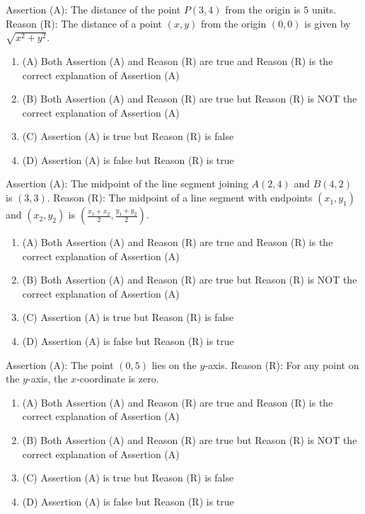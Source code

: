 \documentclass[12pt,a4paper]{exam}
\begin{document}
\begin{questions}
\question[1] Assertion (A): The distance of the point $P(3, 4)$ from the origin is $5$ units. Reason (R): The distance of a point $(x, y)$ from the origin $(0, 0)$ is given by $\sqrt{x^2 + y^2}$.
\begin{enumerate}[label=(\Alph*)]
  \item (A) Both Assertion (A) and Reason (R) are true and Reason (R) is the correct explanation of Assertion (A)
  \item (B) Both Assertion (A) and Reason (R) are true but Reason (R) is NOT the correct explanation of Assertion (A)
  \item (C) Assertion (A) is true but Reason (R) is false
  \item (D) Assertion (A) is false but Reason (R) is true
\end{enumerate}
\vspace{0.15cm}

\question[1] Assertion (A): The midpoint of the line segment joining $A(2, 4)$ and $B(4, 2)$ is $(3, 3)$. Reason (R): The midpoint of a line segment with endpoints $(x_1, y_1)$ and $(x_2, y_2)$ is $(\frac{x_1 + x_2}{2}, \frac{y_1 + y_2}{2})$.
\begin{enumerate}[label=(\Alph*)]
  \item (A) Both Assertion (A) and Reason (R) are true and Reason (R) is the correct explanation of Assertion (A)
  \item (B) Both Assertion (A) and Reason (R) are true but Reason (R) is NOT the correct explanation of Assertion (A)
  \item (C) Assertion (A) is true but Reason (R) is false
  \item (D) Assertion (A) is false but Reason (R) is true
\end{enumerate}
\vspace{0.15cm}

\question[1] Assertion (A): The point $(0, 5)$ lies on the $y$-axis. Reason (R): For any point on the $y$-axis, the $x$-coordinate is zero.
\begin{enumerate}[label=(\Alph*)]
  \item (A) Both Assertion (A) and Reason (R) are true and Reason (R) is the correct explanation of Assertion (A)
  \item (B) Both Assertion (A) and Reason (R) are true but Reason (R) is NOT the correct explanation of Assertion (A)
  \item (C) Assertion (A) is true but Reason (R) is false
  \item (D) Assertion (A) is false but Reason (R) is true
\end{enumerate}
\vspace{0.15cm}


\end{questions}
\end{document}
